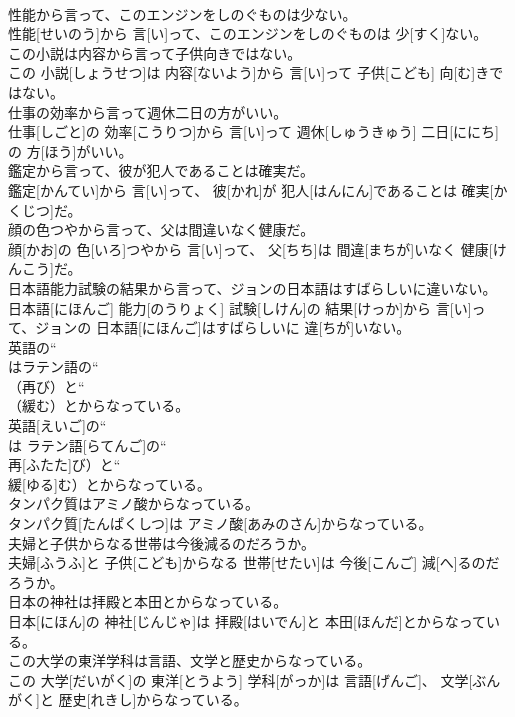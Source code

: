 \documentclass[8pt]{extreport}
\begin{document}
\begin{CJK}{UTF8}{min}
\\	性能から言って、このエンジンをしのぐものは少ない。	
\\	性能[せいのう]から 言[い]って、このエンジンをしのぐものは 少[すく]ない。
\\	この小説は内容から言って子供向きではない。	
\\	この 小説[しょうせつ]は 内容[ないよう]から 言[い]って 子供[こども] 向[む]きではない。
\\	仕事の効率から言って週休二日の方がいい。	
\\	仕事[しごと]の 効率[こうりつ]から 言[い]って 週休[しゅうきゅう] 二日[ににち]の 方[ほう]がいい。
\\	鑑定から言って、彼が犯人であることは確実だ。	
\\	鑑定[かんてい]から 言[い]って、 彼[かれ]が 犯人[はんにん]であることは 確実[かくじつ]だ。
\\	顔の色つやから言って、父は間違いなく健康だ。	
\\	顔[かお]の 色[いろ]つやから 言[い]って、 父[ちち]は 間違[まちが]いなく 健康[けんこう]だ。
\\	日本語能力試験の結果から言って、ジョンの日本語はすばらしいに違いない。	
\\	日本語[にほんご] 能力[のうりょく] 試験[しけん]の 結果[けっか]から 言[い]って、ジョンの 日本語[にほんご]はすばらしいに 違[ちが]いない。
\\	英語の“
\\	はラテン語の“
\\	（再び）と“
\\	（緩む）とからなっている。	
\\	英語[えいご]の“ 
\\	は ラテン語[らてんご]の“ 
\\	再[ふたた]び）と“ 
\\	緩[ゆる]む）とからなっている。
\\	タンパク質はアミノ酸からなっている。	
\\	タンパク質[たんぱくしつ]は アミノ酸[あみのさん]からなっている。
\\	夫婦と子供からなる世帯は今後減るのだろうか。	
\\	夫婦[ふうふ]と 子供[こども]からなる 世帯[せたい]は 今後[こんご] 減[へ]るのだろうか。
\\	日本の神社は拝殿と本田とからなっている。	
\\	日本[にほん]の 神社[じんじゃ]は 拝殿[はいでん]と 本田[ほんだ]とからなっている。
\\	この大学の東洋学科は言語、文学と歴史からなっている。	
\\	この 大学[だいがく]の 東洋[とうよう] 学科[がっか]は 言語[げんご]、 文学[ぶんがく]と 歴史[れきし]からなっている。

\end{CJK}
\end{document}
